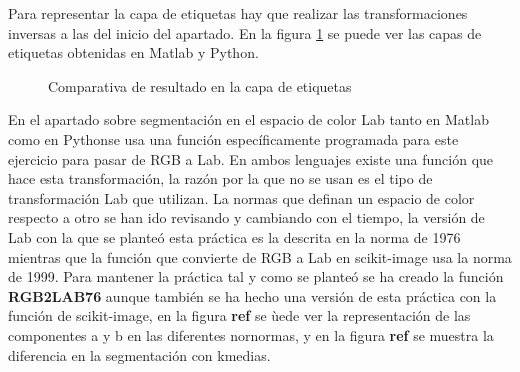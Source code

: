 \documentclass[a4paper,12pt]{report}
\begin{document}
Para representar la capa de etiquetas hay que realizar las transformaciones inversas a las del inicio del apartado. En la figura \ref{comprgb} se puede ver las capas de etiquetas obtenidas en Matlab y Python. \\

\begin{figure}[!tbp]
  \centering
  \hfill
  \caption{Comparativa de resultado en la capa de etiquetas}
  \label{comprgb}
\end{figure}

En el apartado sobre segmentación en el espacio de color Lab tanto en Matlab como en Pythonse usa una función específicamente programada para este ejercicio para pasar de RGB a Lab. En ambos lenguajes existe una función que hace esta transformación, la razón por la que no se usan es el tipo de transformación Lab que utilizan. La normas que definan un espacio de color respecto a otro se han ido revisando y cambiando con el tiempo, la versión de Lab con la que se planteó esta práctica es la descrita en la norma de 1976 mientras que la función que convierte de RGB a Lab en scikit-image usa la norma de 1999. Para mantener la práctica tal y como se planteó se ha creado la función \textbf{RGB2LAB76} aunque también se ha hecho una versión de esta práctica con la función de scikit-image, en la figura \textbf{ref} se ùede ver la representación de las componentes a y b en las diferentes nornormas, y en la figura \textbf{ref} se muestra la diferencia en la segmentación con kmedias.\\
\end{document}
